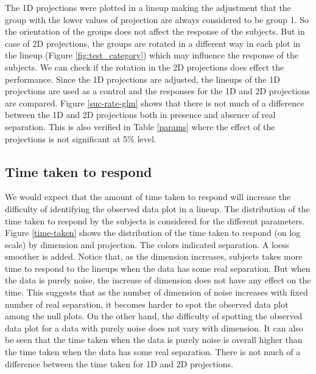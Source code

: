 The 1D projections were plotted in a lineup making the adjustment that the group with the lower values of projection are always considered to be group 1. So the orientation of the groups does not affect the response of the subjects. But in case of 2D projections, the groups are rotated in a different way in each plot in the lineup (Figure \ref{fig:test_category}) which may influence the response of the subjects. We can check if the rotation in the 2D projections does effect the performance. Since the 1D projections are adjusted, the lineups of the 1D projections are used as a control and the responses for the 1D and 2D projections are compared. Figure \ref{suc-rate-glm} shows that there is not much of a difference between the 1D and 2D projections both in presence and absence of real separation. This is also verified in Table \ref{params} where the effect of the projections is not significant at 5\% level.  


\subsection{Time taken to respond}

We would expect that the amount of time taken to respond will increase the difficulty of identifying the observed data plot in a lineup. The distribution of the time taken to respond by the subjects is considered for the different parameters. Figure \ref{time-taken} shows the distribution of the time taken to respond (on log scale) by dimension and projection. The colors indicated separation. A loess smoother is added. Notice that, as the dimension increases, subjects  takes more time to respond to the lineups when the data has some real separation. But when the data is purely noise, the increase of dimension does not have any effect on the time. This suggests that as the number of dimension of noise increases with fixed number of real separation, it becomes harder to spot the observed data plot among the null plots. On the other hand, the difficulty of spotting the observed data plot for a data with purely noise does not vary with dimension. It can also be seen that the time taken when the data is purely noise is overall higher than the time taken when the data has some real separation. There is not much of a difference between the time taken for 1D and 2D projections.



